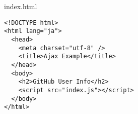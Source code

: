 \begin{listtitle}
index.html
\end{listtitle}
\begin{lstlisting}
<!DOCTYPE html>
<html lang="ja">
  <head>
    <meta charset="utf-8" />
    <title>Ajax Example</title>
  </head>
  <body>
    <h2>GitHub User Info</h2>
    <script src="index.js"></script>
  </body>
</html>
\end{lstlisting}
\listend
